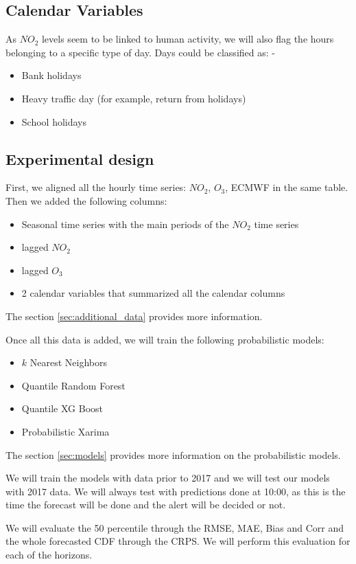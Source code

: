 \documentclass[a4paper,twocolumn,5p]{elsarticle}
\begin{document}
\subsection{Calendar Variables}

As $NO_2$ levels seem to be linked to human activity, we will also flag the hours 
belonging to a specific type of day. Days could be classified as:
-\begin{itemize}
  \item Bank holidays
  \item Heavy traffic day (for example, return from holidays)
  \item School holidays
\end{itemize} 

\subsection{Experimental design}
\label{sec:experimental-design}

First, we aligned all the hourly time series: $NO_2$, $O_3$, ECMWF in the same table. 
Then we added the following columns:
\begin{itemize}
  \item Seasonal time series with the main periods of the $NO_2$ time series
  \item lagged $NO_2$
  \item lagged $O_3$
  \item 2 calendar variables that summarized all the calendar columns
\end{itemize} 
The section \ref{sec:additional_data} provides more information.

Once all this data is added, we will train the following probabilistic 
models:
\begin{itemize}
  \item $k$ Nearest Neighbors
  \item Quantile Random Forest
  \item Quantile XG Boost
  \item Probabilistic Xarima
\end{itemize} 
The section \ref{sec:models} provides more information on the probabilistic models.

We will train the models with data prior to 2017 and we will test our 
models with 2017 data. We will always test with 
predictions done at 10:00, as this is the time the 
forecast will be done and the alert will be decided 
or not.

We will evaluate the 50 percentile through the 
RMSE, MAE, Bias and Corr 
and the whole forecasted CDF through the CRPS. We will perform
this evaluation for each of the horizons.
\end{document}
